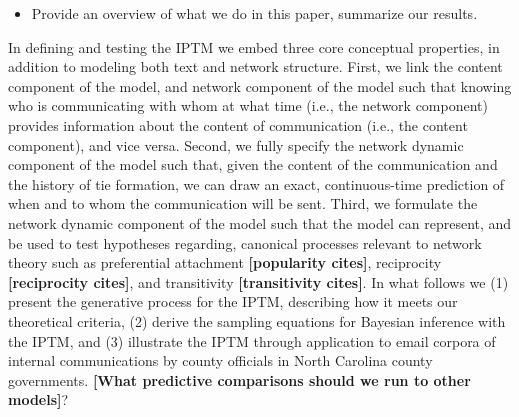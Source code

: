 \documentclass[a4paper]{article}
\begin{document}
\begin{itemize}
\item Provide an overview of what we do in this paper, summarize our results.
\end{itemize}

In defining and testing the IPTM we embed three core conceptual properties, in addition to modeling both text and network structure. First, we link the content component of the model, and network component of the model such that knowing who is communicating with whom at what time (i.e., the network component) provides information about the content of communication (i.e., the content component),  and vice versa. Second, we fully specify the network dynamic component of the model such that, given the content of the communication and the history of tie formation, we can draw an exact, continuous-time prediction of when and to whom the communication will be sent. Third, we formulate the network dynamic component of the model such that the model can represent, and be used to test hypotheses regarding, canonical processes relevant to network theory such as preferential attachment {\bf [popularity cites]}, reciprocity {\bf [reciprocity cites]}, and transitivity {\bf [transitivity cites]}. In what follows we (1) present the generative process for the IPTM, describing how it meets our theoretical criteria, (2) derive the sampling equations for Bayesian inference with the IPTM, and (3) illustrate the IPTM through application to email corpora of internal communications by county officials in North Carolina county governments. {\bf [What predictive comparisons should we run to other models]}?

\end{document}
